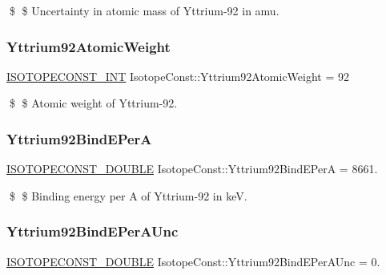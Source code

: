 \$ \$ Uncertainty in atomic mass of Yttrium-\/92 in amu. \mbox{\label{group___isotope_const-_yttrium-_y92_ga1115f93385d3294d1469f49f2486008e}} 
\subsubsection{\texorpdfstring{Yttrium92\+Atomic\+Weight}{Yttrium92AtomicWeight}}
{\footnotesize\ttfamily \mbox{\hyperlink{group___isotope_const-_macros_ga5f18360b3e99483a35c32d789e62621c}{I\+S\+O\+T\+O\+P\+E\+C\+O\+N\+S\+T\+\_\+\+I\+NT}} Isotope\+Const\+::\+Yttrium92\+Atomic\+Weight = 92}

\$ \$ Atomic weight of Yttrium-\/92. \mbox{\label{group___isotope_const-_yttrium-_y92_gaba473577bf844b7f9443fbc9d4f07a2c}} 
\subsubsection{\texorpdfstring{Yttrium92\+Bind\+E\+PerA}{Yttrium92BindEPerA}}
{\footnotesize\ttfamily \mbox{\hyperlink{group___isotope_const-_macros_ga8f45a7272ce02c0b4c65c44636ed719a}{I\+S\+O\+T\+O\+P\+E\+C\+O\+N\+S\+T\+\_\+\+D\+O\+U\+B\+LE}} Isotope\+Const\+::\+Yttrium92\+Bind\+E\+PerA = 8661.}

\$ \$ Binding energy per A of Yttrium-\/92 in keV. \mbox{\label{group___isotope_const-_yttrium-_y92_gaf19aefb6b85a26b57cf10a055f061bb4}} 
\subsubsection{\texorpdfstring{Yttrium92\+Bind\+E\+Per\+A\+Unc}{Yttrium92BindEPerAUnc}}
{\footnotesize\ttfamily \mbox{\hyperlink{group___isotope_const-_macros_ga8f45a7272ce02c0b4c65c44636ed719a}{I\+S\+O\+T\+O\+P\+E\+C\+O\+N\+S\+T\+\_\+\+D\+O\+U\+B\+LE}} Isotope\+Const\+::\+Yttrium92\+Bind\+E\+Per\+A\+Unc = 0.}

